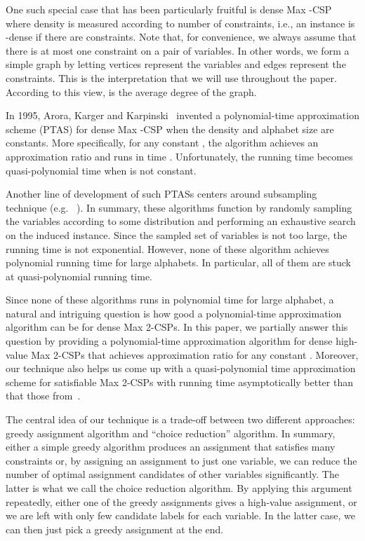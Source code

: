 \documentclass{article}
\begin{document}
One such special case that has been particularly fruitful is dense {\sc Max -CSP} where density is measured according to number of constraints, i.e., an instance is -dense if there are  constraints. Note that, for convenience, we always assume that there is at most one constraint on a pair of variables. In other words, we form a simple graph by letting vertices represent the variables and edges represent the constraints. This is the interpretation that we will use throughout the paper. According to this view,  is the average degree of the graph.

In 1995, Arora, Karger and Karpinski~\cite{AKK95} invented a polynomial-time approximation scheme (PTAS) for dense Max -CSP when the density  and alphabet size  are constants. More specifically, for any constant , the algorithm achieves an approximation ratio  and runs in time . Unfortunately, the running time becomes quasi-polynomial time when  is not constant.

Another line of development of such PTASs centers around subsampling technique (e.g. ~\cite{AIM, Alon:2003:RSA:963875.963877, BMHS11}). In summary, these algorithms function by randomly sampling the variables according to some distribution and performing an exhaustive search on the induced instance. Since the sampled set of variables is not too large, the running time is not exponential. However, none of these algorithm achieves polynomial running time for large alphabets. In particular, all of them are stuck at quasi-polynomial running time.

Since none of these algorithms runs in polynomial time for large alphabet, a natural and intriguing question is how good a polynomial-time approximation algorithm can be for dense {\sc Max 2-CSP}s. In this paper, we partially answer this question by providing a polynomial-time approximation algorithm for dense high-value {\sc Max 2-CSP}s that achieves  approximation ratio for any constant . Moreover, our technique also helps us come up with a quasi-polynomial time approximation scheme for satisfiable {\sc Max 2-CSP}s with running time asymptotically better than that those from~\cite{AIM, Alon:2003:RSA:963875.963877, AKK95, BMHS11}.

The central idea of our technique is a trade-off between two different approaches: greedy assignment algorithm and ``choice reduction'' algorithm. In summary, either a simple greedy algorithm produces an assignment that satisfies many constraints or, by assigning an assignment to just one variable, we can reduce the number of optimal assignment candidates of other variables significantly. The latter is what we call the choice reduction algorithm. By applying this argument repeatedly, either one of the greedy assignments gives a high-value assignment, or we are left with only few candidate labels for each variable. In the latter case, we can then just pick a greedy assignment at the end.
\end{document}
